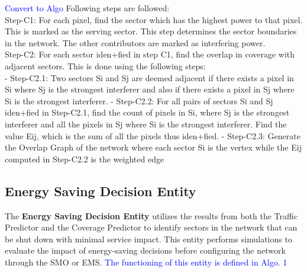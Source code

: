\documentclass[conference]{IEEEtran}
\begin{document}
\textcolor{blue}{Convert to Algo}
Following steps are followed: \\
Step-C1: For each pixel, find the sector which has the highest power to that pixel. This is marked as the serving sector. This step determines the sector boundaries in the network. The other contributors are marked as interfering power. \\
Step-C2: For each sector iden+fied in step C1, find the overlap in coverage with adjacent sectors. This is done using the following steps: \\
	- Step-C2.1: Two sectors Si and Sj are deemed adjacent if there exists a pixel in Si where Sj is the strongest interferer and also if there exists a pixel in Sj where Si is the strongest interferer.
	- Step-C2.2: For all pairs of sectors Si and Sj iden+fied in Step-C2.1, find the count of pixels in Si, where Sj is the strongest interferer and all the pixels in Sj where Si is the strongest interferer. Find the value Eij, which is the sum of all the pixels thus iden+fied.
	- Step-C2.3: Generate the Overlap Graph of the network where each sector Si is the vertex while the Eij computed in Step-C2.2 is the weighted edge

\begin{comment}
\begin{algorithm} [H]
\caption{Coverage Predictor}
\label{alg:control_application}
\SetKwInOut{Input}{Input}
\SetKwInOut{Output}{Output}

\Input{DecisionVariables}

\SetKwProg{Fn}{Function \emph{applyControl}}{}{end}
\Fn{}{
    delay $\gets$ EWMA(delay, delay_in)\;
    
    \While{True}
    {
        \If{$condition1$}
        {
            \Return{$CellBringup$}\;
        }
        \ElseIf{$condition2$}
        {
            \Return{$CellShutdown$}\;
        }
        \Else
        {
            $NoChange$\;
        }
    }
}

\Output{$Control\_Action$} %

\end{algorithm}
\end{comment}

\subsection{Energy Saving Decision Entity}

The \textbf{Energy Saving Decision Entity} utilizes the results from both the Traffic Predictor and the Coverage Predictor to identify sectors in the network that can be shut down with minimal service impact. This entity performs simulations to evaluate the impact of energy-saving decisions before configuring the network through the SMO or EMS. \textcolor{blue}{The functioning of this entity is defined in Algo. 1}
\end{document}
